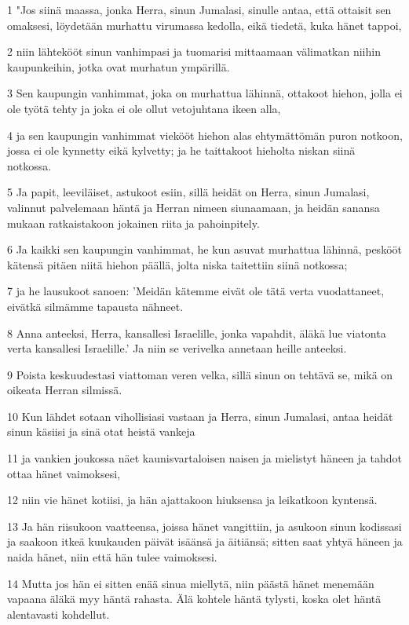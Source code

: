 \par 1 "Jos siinä maassa, jonka Herra, sinun Jumalasi, sinulle antaa, että ottaisit sen omaksesi, löydetään murhattu virumassa kedolla, eikä tiedetä, kuka hänet tappoi,
\par 2 niin lähtekööt sinun vanhimpasi ja tuomarisi mittaamaan välimatkan niihin kaupunkeihin, jotka ovat murhatun ympärillä.
\par 3 Sen kaupungin vanhimmat, joka on murhattua lähinnä, ottakoot hiehon, jolla ei ole työtä tehty ja joka ei ole ollut vetojuhtana ikeen alla,
\par 4 ja sen kaupungin vanhimmat viekööt hiehon alas ehtymättömän puron notkoon, jossa ei ole kynnetty eikä kylvetty; ja he taittakoot hieholta niskan siinä notkossa.
\par 5 Ja papit, leeviläiset, astukoot esiin, sillä heidät on Herra, sinun Jumalasi, valinnut palvelemaan häntä ja Herran nimeen siunaamaan, ja heidän sanansa mukaan ratkaistakoon jokainen riita ja pahoinpitely.
\par 6 Ja kaikki sen kaupungin vanhimmat, he kun asuvat murhattua lähinnä, peskööt kätensä pitäen niitä hiehon päällä, jolta niska taitettiin siinä notkossa;
\par 7 ja he lausukoot sanoen: 'Meidän kätemme eivät ole tätä verta vuodattaneet, eivätkä silmämme tapausta nähneet.
\par 8 Anna anteeksi, Herra, kansallesi Israelille, jonka vapahdit, äläkä lue viatonta verta kansallesi Israelille.' Ja niin se verivelka annetaan heille anteeksi.
\par 9 Poista keskuudestasi viattoman veren velka, sillä sinun on tehtävä se, mikä on oikeata Herran silmissä.
\par 10 Kun lähdet sotaan vihollisiasi vastaan ja Herra, sinun Jumalasi, antaa heidät sinun käsiisi ja sinä otat heistä vankeja
\par 11 ja vankien joukossa näet kaunisvartaloisen naisen ja mielistyt häneen ja tahdot ottaa hänet vaimoksesi,
\par 12 niin vie hänet kotiisi, ja hän ajattakoon hiuksensa ja leikatkoon kyntensä.
\par 13 Ja hän riisukoon vaatteensa, joissa hänet vangittiin, ja asukoon sinun kodissasi ja saakoon itkeä kuukauden päivät isäänsä ja äitiänsä; sitten saat yhtyä häneen ja naida hänet, niin että hän tulee vaimoksesi.
\par 14 Mutta jos hän ei sitten enää sinua miellytä, niin päästä hänet menemään vapaana äläkä myy häntä rahasta. Älä kohtele häntä tylysti, koska olet häntä alentavasti kohdellut.
